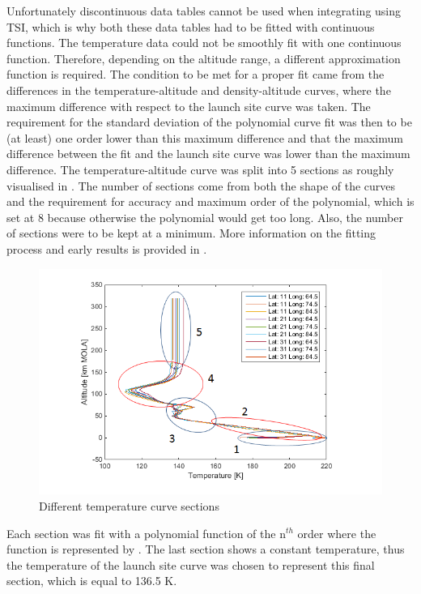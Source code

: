 Unfortunately discontinuous data tables cannot be used when integrating using \ac{TSI}, which is why both these data tables had to be fitted with continuous functions. The temperature data could not be smoothly fit with one continuous function.  Therefore, depending on the altitude range, a different approximation function is required. The condition to be met for a proper fit came from the differences in the temperature-altitude and density-altitude curves, where the maximum difference with respect to the launch site curve was taken. The requirement for the standard deviation of the polynomial curve fit was then to be (at least) one order lower than this maximum difference and that the maximum difference between the fit and the launch site curve was lower than the maximum difference. The temperature-altitude curve was split into 5 sections as roughly visualised in . The number of sections come from both the shape of the curves and the requirement for accuracy and maximum order of the polynomial, which is set at 8 because otherwise the polynomial would get too long. Also, the number of sections were to be kept at a minimum. More information on the fitting process and early results is provided in .

\begin{figure}[!ht]
\centering
\includegraphics[width=1.0\textwidth]{figures/software/temperatureDataSplit5.png}
\caption{Different temperature curve sections}
\label{fig:temperatureDataSplit5}
\end{figure}

Each section was fit with a polynomial function of the n$^{th}$ order where the function is represented by . The last section shows a constant temperature, thus the temperature of the launch site curve was chosen to represent this final section, which is equal to 136.5 K.

